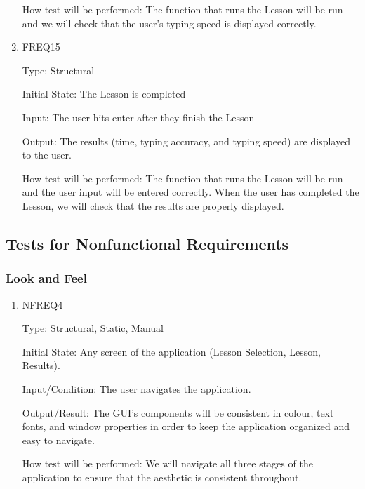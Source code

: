\documentclass[12pt, titlepage]{article}
\begin{document}
\begin{enumerate}
How test will be performed:  The function that runs the Lesson will be run and we will check that the user's typing speed is displayed correctly.  

\item{FREQ15\\}

Type: Structural
					
Initial State: The Lesson is completed
					
Input: The user hits enter after they finish the Lesson
					
Output: The results (time, typing accuracy, and typing speed) are displayed to the user.
		
How test will be performed: The function that runs the Lesson will be run and the user input will be entered correctly. When the user has completed the Lesson, we will check that the results are properly displayed.

\end{enumerate}

\subsection{Tests for Nonfunctional Requirements}

\subsubsection{Look and Feel}

\begin{enumerate}

\item{NFREQ4}

Type: Structural, Static, Manual
					
Initial State: Any screen of the application (Lesson Selection, Lesson, Results).
					
Input/Condition: The user navigates the application.
					
Output/Result: The GUI's components will be consistent in colour, text fonts, and window properties in order to keep the application organized and easy to navigate.
					
How test will be performed: We will navigate all three stages of the application to ensure that the aesthetic is consistent throughout.

\end{enumerate}
\end{document}
